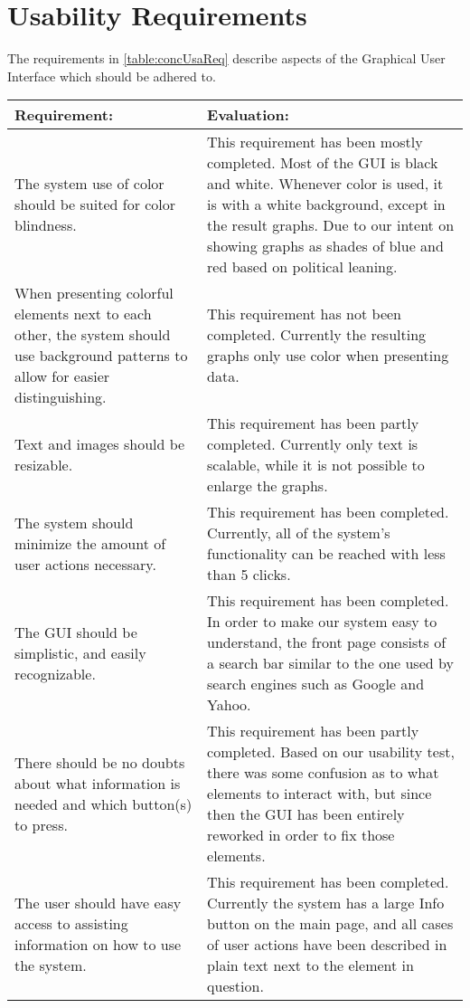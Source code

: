 \section{Usability Requirements}\label{sec:concUsa}
The requirements in \autoref{table:concUsaReq} describe aspects of the Graphical
User Interface which should be adhered to.

\begin{longtable}{|p{6cm}|p{8cm}|}\hline
\textbf{Requirement:}	&	\textbf{Evaluation:} \\\hline
The system use of color should be suited for color blindness.
&	This requirement has been mostly completed. Most of the GUI is black and
white. Whenever color is used, it is with a white background, except in the
result graphs. Due to our intent on showing graphs as shades of blue and red
based on political leaning.\\\hline 
When presenting colorful elements next to each other, the system should use
background patterns to allow for easier distinguishing.
& This requirement has not been completed. Currently the resulting graphs only
use color when presenting data. \\\hline
Text and images should be resizable.
&	This requirement has been partly completed. Currently only text is scalable,
while it is not possible to enlarge the graphs.\\\hline
The system should minimize the amount of user actions necessary.
&	This requirement has been completed. Currently, all of the system's
functionality can be reached with less than 5 clicks.\\\hline
The GUI should be simplistic, and easily recognizable.
&	This requirement has been completed. In order to make our system easy to
understand, the front page consists of a search bar similar to the one used by
search engines such as Google and Yahoo.\\\hline
There should be no doubts about what information is
needed and which button(s) to press. 
&	This requirement has been partly completed. Based on our usability test, there
was some confusion as to what elements to interact with, but since then the GUI
has been entirely reworked in order to fix those elements. \\\hline
The user should have easy access to assisting information on how to use the
system. 
&	This requirement has been completed. Currently the system has a large Info
button on the main page, and all cases of user actions have been described in
plain text next to the element in question. \\\hline

\end{longtable}
